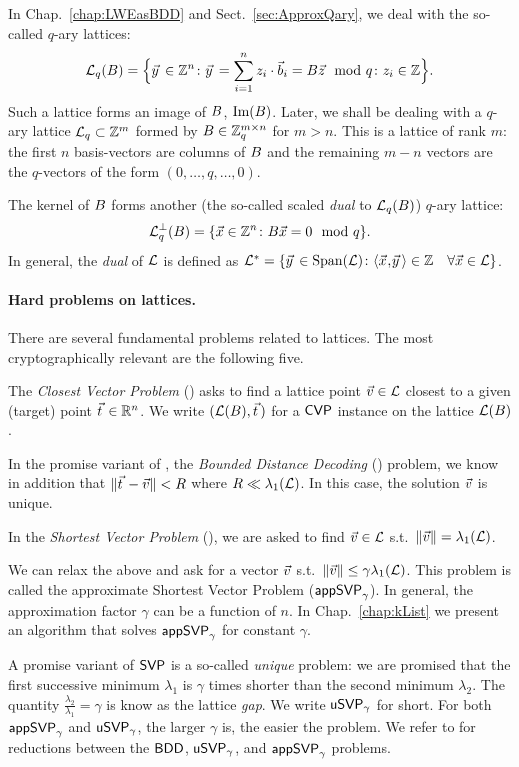 In Chap.~\ref{chap:LWEasBDD} and Sect.~\ref{sec:ApproxQary}, we deal with the so-called $q$-ary lattices:
\[
	\qLat (\BMat) = \Bigl\{\yvec \in \Z^n \colon \yvec = \sum_{i=1}^n z_i \cdot \bvec_i = \BMat \zvec \mod q \colon z_i \in \Z \Bigr\}.
\]
Such a lattice forms an image of $B$, $\text{Im}(B)$. Later, we shall be dealing with a $q$-ary lattice $\mathcal{L}_q \subset {{\mathbb Z}}^m$ formed by $B \in {{\mathbb Z}}_q^{m \times n}$ for $m > n$. This is a lattice of rank $m$: the first $n$ basis-vectors are columns of $B$ and the remaining $m-n$ vectors are the $q$-vectors of the form $(0, \ldots, q, \ldots, 0)$.

The kernel of $B$ forms another (the so-called scaled \emph{dual} to $\mathcal{L}_q (B)$) $q$-ary lattice: 
\[
	\mathcal{L}_q^{\perp} (B) = \{ \vec x \in {{\mathbb Z}}^n \colon B \vec x = 0 \mod q \}.
\] 
In general, the \emph{dual} of $\mathcal{L}$ is defined as $\Lat^* = \{ \yvec \in \Span(\Lat) \colon \ScProd{\xvec}{\yvec} \in \Z \quad \forall \xvec \in \Lat \}$.

\paragraph{Hard problems on lattices.} There are several fundamental problems related to lattices. The most cryptographically relevant are the following five. 

The \emph{Closest Vector Problem} (\CVP) asks to find a lattice point $\vvec \in \Lat$ closest to a given (target) point $\tvec \in \R^n$. We write $(\Lat(\BMat), \tvec)$ for a $\textsf{CVP}$ instance on the lattice $\mathcal{L}(B)$.

In the promise variant of \CVP, the \emph{Bounded Distance Decoding} (\BDD) problem, we know in addition that $\| \tvec - \vvec \| < R$ where $R \ll \lambda_1(\mathcal{L})$. In this case, the solution $\vvec$ is unique.

In the \emph{Shortest Vector Problem} (\SVP), we are asked to find $\vvec \in \Lat$ s.t.\ $\| \vvec \| = \lambda_1 (\Lat)$. 

We can relax the above and ask for a vector $\vvec$ s.t.\ $\| \vvec \| \leq \gamma \lambda_1 (\Lat)$. This problem is called the approximate Shortest Vector Problem ($\textsf{appSVP}_{\gamma}$). In general, the approximation factor $\gamma$ can be a function of $n$. In Chap.~\ref{chap:kList} we present an algorithm that solves $\textsf{appSVP}_{\gamma}$ for constant $\gamma$.

A promise variant of $\textsf{SVP}$ is a so-called \emph{unique} \SVP problem: we are promised that the first successive minimum $\lambda_1$ is $\gamma$ times shorter than the second minimum $\lambda_2$. The quantity $\tfrac{\lambda_2}{\lambda_1} = \gamma$ is know as the lattice \emph{gap}. We write $\textsf{uSVP}_{\gamma}$ for short. For both $\textsf{appSVP}_{\gamma}$ and $\textsf{uSVP}_{\gamma}$, the larger $\gamma$ is, the easier the problem. We refer to \cite{C:LyuMic09} for reductions between the $\textsf{BDD}$, $\textsf{uSVP}_{\gamma}$, and $\textsf{appSVP}_{\gamma}$ problems.   

